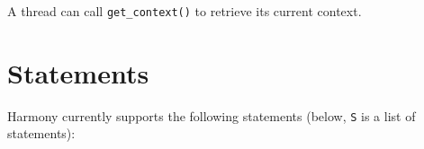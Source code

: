 \documentclass{report}
\begin{document}

A thread can call \texttt{get\_context()} to retrieve its current
context.

\section{Statements}

Harmony currently supports the following statements
(below, \texttt{S} is a list of statements):
\end{document}

